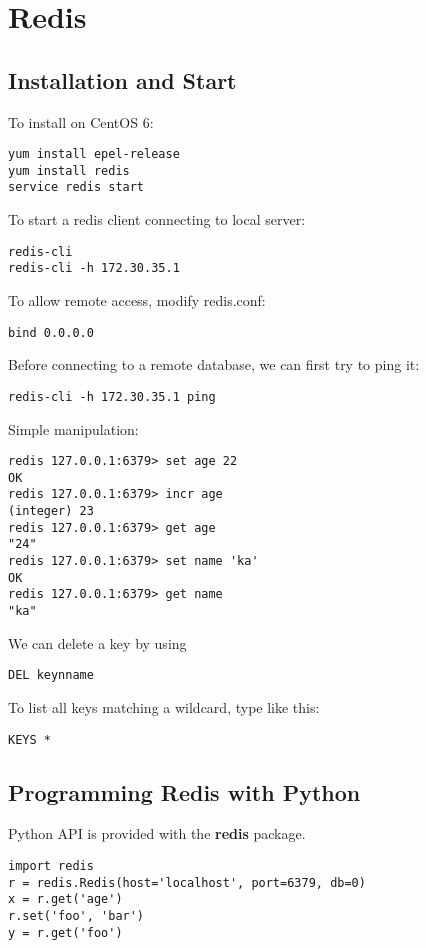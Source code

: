 \section{Redis}

\subsection{Installation and Start}

To install on CentOS 6:
\begin{verbatim}
yum install epel-release
yum install redis
service redis start
\end{verbatim}

To start a redis client connecting to local server:
\begin{verbatim}
redis-cli
redis-cli -h 172.30.35.1 
\end{verbatim}

To allow remote access, modify redis.conf:
\begin{verbatim}
bind 0.0.0.0
\end{verbatim}

Before connecting to a remote database, we can first try to ping it:
\begin{verbatim}
redis-cli -h 172.30.35.1 ping
\end{verbatim}

Simple manipulation:
\begin{verbatim}
redis 127.0.0.1:6379> set age 22
OK
redis 127.0.0.1:6379> incr age
(integer) 23
redis 127.0.0.1:6379> get age
"24"
redis 127.0.0.1:6379> set name 'ka'
OK
redis 127.0.0.1:6379> get name
"ka"
\end{verbatim}

We can delete a key by using 
\begin{verbatim}
DEL keynname
\end{verbatim}


To list all keys matching a wildcard, type like this:
\begin{verbatim}
KEYS *
\end{verbatim}

\subsection{Programming Redis with Python}
Python API is provided with the \textbf{redis} package.

\begin{verbatim}
import redis
r = redis.Redis(host='localhost', port=6379, db=0)
x = r.get('age')
r.set('foo', 'bar')
y = r.get('foo')
\end{verbatim}









